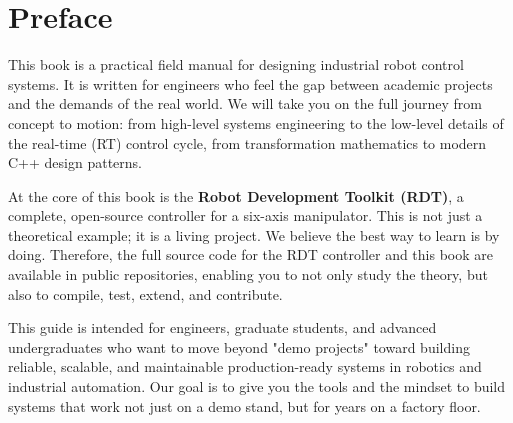 \newpage
\chapter*{Preface}

This book is a practical field manual for designing industrial robot control systems. It is written for engineers who feel the gap between academic projects and the demands of the real world. We will take you on the full journey from concept to motion: from high-level systems engineering to the low-level details of the real-time (RT) control cycle, from transformation mathematics to modern C++ design patterns.

At the core of this book is the \textbf{Robot Development Toolkit (RDT)}, a complete, open-source controller for a six-axis manipulator. This is not just a theoretical example; it is a living project. We believe the best way to learn is by doing. Therefore, the full source code for the RDT controller and this book are available in public repositories, enabling you to not only study the theory, but also to compile, test, extend, and contribute.

This guide is intended for engineers, graduate students, and advanced undergraduates who want to move beyond "demo projects" toward building reliable, scalable, and maintainable production-ready systems in robotics and industrial automation. Our goal is to give you the tools and the mindset to build systems that work not just on a demo stand, but for years on a factory floor.